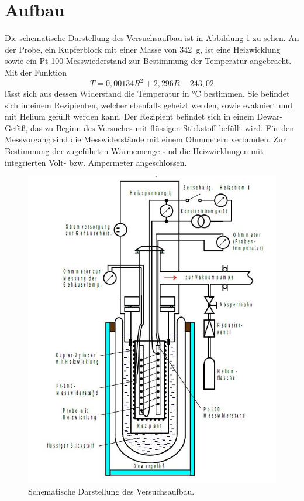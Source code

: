 \section{Aufbau}
\label{sec:Aufbau}

Die schematische Darstellung des Versuchsaufbau ist in Abbildung \ref{fig:aufbau} zu sehen. An der Probe, ein Kupferblock mit einer Masse von \SI{342}{\gram},  ist eine Heizwicklung sowie ein Pt-100 Messwiederstand zur Bestimmung der Temperatur angebracht.
Mit der Funktion
\begin{equation}
	T = 0,00134 R^2 + 2,296 R -243,02
	\label{eq:pt100}
\end{equation}
lässt sich aus dessen Widerstand die Temperatur in °C bestimmen.
 Sie befindet sich in einem Rezipienten, welcher ebenfalls geheizt werden, sowie evakuiert und mit Helium gefüllt werden kann. Der Rezipient befindet sich in einem Dewar-Gefäß, das zu Beginn des Versuches mit flüssigen Stickstoff befüllt wird. Für den Messvorgang sind die Messwiderstände mit einem Ohmmetern verbunden.
Zur Bestimmung der zugeführten Wärmemenge sind die Heizwicklungen mit integrierten Volt- bzw. Ampermeter angeschlossen.

\begin{figure}
  \centering
  \includegraphics{build/Aufbau.jpg}
  \caption{Schematische Darstellung des Versuchsaufbau.\cite{Anleitung}}
  \label{fig:aufbau}
\end{figure}


